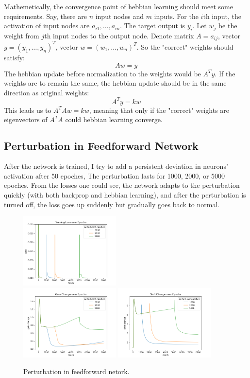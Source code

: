 \documentclass[12pt, a4paper]{article}
\begin{document}
Mathemetically, the convergence point of hebbian learning should meet some requirements. Say, there are $n$ input nodes and $m$ inputs. For the $i$th input, the activation of input nodes are $a_{i1},\dots,a_{in}$. The target output is $y_i$. Let $w_j$ be the weight from $j$th input nodes to the output node. Denote matrix $A={a_{ij}}$, vector $y=(y_1,\dots,y_n)^T$, vector $w=(w_1,\dots,w_n)^T$. So the "correct" weights should satisfy: $$Aw=y$$
The hebbian update before normalization to the weights would be $A^Ty$. If the weights are to remain the same, the hebbian update should be in the same direction as original weights: $$A^Ty=kw$$
This leads us to $A^TAw=kw$, meaning that only if the "correct" weights are eigenvectors of $A^TA$ could hebbian learning converge.

\subsection*{Perturbation in Feedforward Network}

After the network is trained, I try to add a persistent deviation in neurons' activation after 50 epoches, The perturbation lasts for 1000, 2000, or 5000 epoches. From the losses one could see, the network adapts to the perturbation quickly (with both backprop and hebbian learning), and after the perturbation is turned off, the loss goes up suddenly but gradually goes back to normal.

\begin{figure}[H]
    \centering
    \includegraphics[width=0.45\textwidth]{FNN/fig/0122_abb05_perturb_loss.png} \\
    \includegraphics[width=0.45\textwidth]{FNN/fig/0122_abb05_perturb_gc.png} 
    \includegraphics[width=0.45\textwidth]{FNN/fig/0122_abb05_perturb_sc.png}
    \caption{Perturbation in feedforward netork.}
\end{figure}
\end{document}
